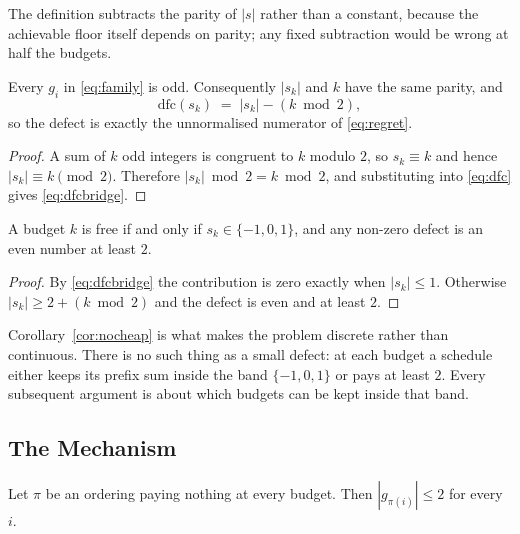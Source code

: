 The definition subtracts the parity of $|s|$ rather than a constant, because the achievable
floor itself depends on parity; any fixed subtraction would be wrong at half the budgets.

\begin{theorem}
\label{thm:parity}
Every $g_{i}$ in \eqref{eq:family} is odd. Consequently $|s_{k}|$ and $k$ have the same
parity, and
\begin{equation}
\mathrm{dfc}(s_{k})\;=\;|s_{k}|-(k\bmod2),
\label{eq:dfcbridge}
\end{equation}
so the defect is exactly the unnormalised numerator of \eqref{eq:regret}.
\end{theorem}

\begin{proof}
A sum of $k$ odd integers is congruent to $k$ modulo $2$, so $s_{k}\equiv k$ and hence
$|s_{k}|\equiv k \pmod 2$. Therefore $|s_{k}|\bmod2=k\bmod2$, and substituting into
\eqref{eq:dfc} gives \eqref{eq:dfcbridge}.
\end{proof}


\begin{corollary}
\label{cor:nocheap}
A budget $k$ is free if and only if $s_{k}\in\{-1,0,1\}$, and any non-zero defect is an even
number at least $2$.
\end{corollary}

\begin{proof}
By \eqref{eq:dfcbridge} the contribution is zero exactly when $|s_{k}|\le1$. Otherwise
$|s_{k}|\ge2+(k\bmod2)$ and the defect is even and at least $2$.
\end{proof}


Corollary~\ref{cor:nocheap} is what makes the problem discrete rather than continuous. There
is no such thing as a small defect: at each budget a schedule either keeps its prefix sum
inside the band $\{-1,0,1\}$ or pays at least $2$. Every subsequent argument is about which
budgets can be kept inside that band.

\subsection{The Mechanism}
\label{sec:mechanism}

\begin{lemma}
\label{lem:nobigstep}
Let $\pi$ be an ordering paying nothing at every budget. Then $|g_{\pi(i)}|\le2$ for every
$i$.
\end{lemma}

